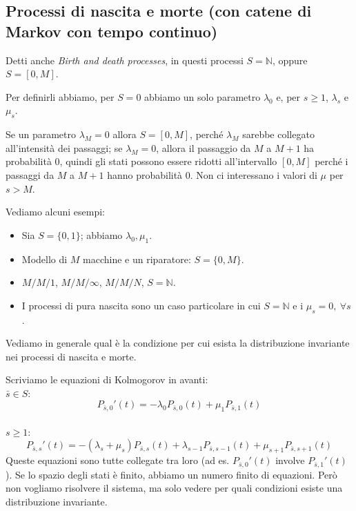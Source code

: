 \documentclass[a4paper,12pt]{book}
\begin{document}
\subsection{Processi di nascita e morte (con catene di Markov con tempo continuo)}
Detti anche \textit{Birth and death processes}, in questi processi $ S = \mathbb{N} $, oppure $ S = [0, M] $. 

Per definirli abbiamo, per $ S=0 $ abbiamo un solo parametro $\lambda_0$ e, per $ s \ge 1 $, $\lambda_s$ e $\mu_s$.

Se un parametro $\lambda_M=0$ allora $ S = [0, M] $, perché $\lambda_M$ sarebbe collegato all'intensità dei passaggi; se $\lambda_M=0$, allora il passaggio da $ M $ a $ M+1 $ ha probabilità 0, quindi gli stati possono essere ridotti all'intervallo $ [0,M] $ perché i passaggi da $ M $ a $ M+1 $ hanno probabilità 0. Non ci interessano i valori di $\mu$ per $ s > M $.

Vediamo alcuni esempi:
\begin{itemize}
	\item  Sia $ S = \{0,1\} $; abbiamo $\lambda_0, \mu_1$.
	\item Modello di $ M $ macchine e un riparatore: $ S = \{0, M\} $.
	\item $ M/M/1 $, $ M/M/\infty $, $ M/M/N $, $ S = \mathbb{N} $.
	\item I processi di pura nascita sono un caso particolare in cui $ S = \mathbb{N} $ e i $ \mu_s = 0, \ \forall s $.
\end{itemize}

Vediamo in generale qual è la condizione per cui esista la distribuzione invariante nei processi di nascita e morte. 

Scriviamo le equazioni di Kolmogorov in avanti:
\\
$ \bar{s} \in S $:
$$ P_{\bar{s}, 0}'(t) = -\lambda_0 P_{\bar{s}, 0}(t) + \mu_1 P_{\bar{s},1}(t) $$ 
\\
$ s \ge 1 $:
$$ P_{\bar{s},s}'(t) = -(\lambda_s + \mu_s) P_{\bar{s}, s}(t) + \lambda_{s-1} P_{\bar{s},s-1}(t) + \mu_{s+1} P_{\bar{s}, s+1}(t) $$ 
Queste equazioni sono tutte collegate tra loro (ad es. $ P_{\bar{s}, 0}'(t)$ involve $ P_{\bar{s}, 1}'(t) $). Se lo spazio degli stati è finito, abbiamo un numero finito di equazioni. 
Però non vogliamo risolvere il sistema, ma solo vedere per quali condizioni esiste una distribuzione invariante. 
\end{document}
